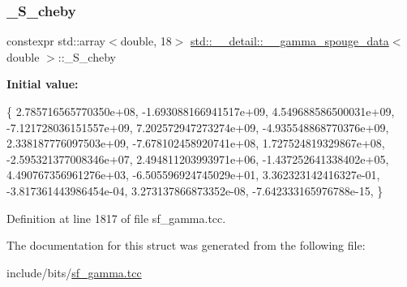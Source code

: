 \subsubsection{\texorpdfstring{\+\_\+\+S\+\_\+cheby}{\_S\_cheby}}
{\footnotesize\ttfamily constexpr std\+::array$<$double, 18$>$ \hyperlink{structstd_1_1____detail_1_1____gamma__spouge__data}{std\+::\+\_\+\+\_\+detail\+::\+\_\+\+\_\+gamma\+\_\+spouge\+\_\+data}$<$ double $>$\+::\+\_\+\+S\+\_\+cheby\hspace{0.3cm}{\ttfamily [static]}}

{\bfseries Initial value\+:}
\begin{DoxyCode}
\{
     2.785716565770350e+08,
    -1.693088166941517e+09,
     4.549688586500031e+09,
    -7.121728036151557e+09,
     7.202572947273274e+09,
    -4.935548868770376e+09,
     2.338187776097503e+09,
    -7.678102458920741e+08,
     1.727524819329867e+08,
    -2.595321377008346e+07,
     2.494811203993971e+06,
    -1.437252641338402e+05,
     4.490767356961276e+03,
    -6.505596924745029e+01,
     3.362323142416327e-01,
    -3.817361443986454e-04,
     3.273137866873352e-08,
    -7.642333165976788e-15,
      \}
\end{DoxyCode}


Definition at line 1817 of file sf\+\_\+gamma.\+tcc.



The documentation for this struct was generated from the following file\+:\begin{DoxyCompactItemize}
\item 
include/bits/\hyperlink{sf__gamma_8tcc}{sf\+\_\+gamma.\+tcc}\end{DoxyCompactItemize}
